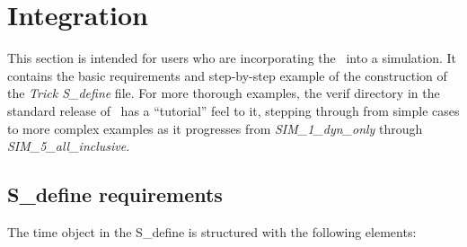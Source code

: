 %
%
% 
%

 \section{Integration}\label{sec:Integration}

This section is intended for users who are incorporating the \timeDesc\ into a simulation.  It contains the basic requirements and step-by-step example of the construction of the \textit{Trick S\_define} file.  For more thorough examples, the verif directory in the standard release of \JEODid\ has a ``tutorial'' feel to it, stepping through from simple cases to more complex examples as it progresses from \textit{SIM\_1\_dyn\_only} through \textit{SIM\_5\_all\_inclusive}.


\subsection{S\_define requirements}
The time object in the S\_define is structured with the following
elements:


